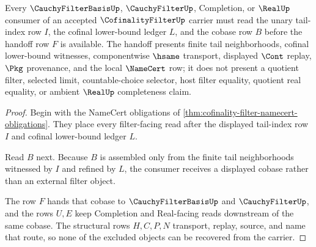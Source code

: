 \begin{theorem}\label{thm:cofinality-filter-tail-cobase-handoff}
Every $\CauchyFilterBasisUp$, $\CauchyFilterUp$, Completion, or $\RealUp$ consumer of an accepted $\CofinalityFilterUp$ carrier must read the unary tail-index row $I$, the cofinal lower-bound ledger $L$, and the cobase row $B$ before the handoff row $F$ is available. The handoff presents finite tail neighborhoods, cofinal lower-bound witnesses, componentwise $\hsame$ transport, displayed $\Cont$ replay, $\Pkg$ provenance, and the local $\NameCert$ row; it does not present a quotient filter, selected limit, countable-choice selector, host filter equality, quotient real equality, or ambient $\RealUp$ completeness claim.
\end{theorem}
\begin{proof}
Begin with the NameCert obligations of \autoref{thm:cofinality-filter-namecert-obligations}. They place every filter-facing read after the displayed tail-index row $I$ and cofinal lower-bound ledger $L$.

Read $B$ next. Because $B$ is assembled only from the finite tail neighborhoods witnessed by $I$ and refined by $L$, the consumer receives a displayed cobase rather than an external filter object.

The row $F$ hands that cobase to $\CauchyFilterBasisUp$ and $\CauchyFilterUp$, and the rows $U,E$ keep Completion and Real-facing reads downstream of the same cobase. The structural rows $H,C,P,N$ transport, replay, source, and name that route, so none of the excluded objects can be recovered from the carrier.
\end{proof}


\begin{closurestatus}{\CofinalityFilterUp}
  \theoryclosure{\seedClosure}
  \formalstatus{\unformalizedV}
\end{closurestatus}
